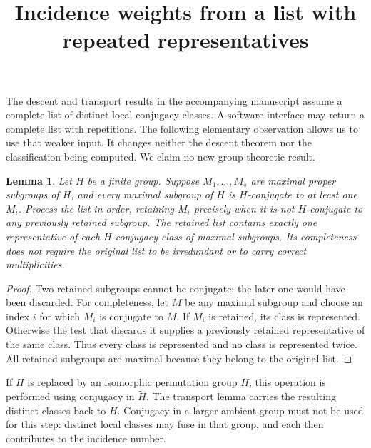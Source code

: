 \documentclass[11pt]{article}
\title{Incidence weights from a list with repeated representatives}
\author{}
\date{}
\newtheorem{lemma}{Lemma}
\begin{document}
\maketitle

The descent and transport results in the accompanying manuscript assume a
complete list of distinct local conjugacy classes. A software interface may
return a complete list with repetitions. The following elementary observation
allows us to use that weaker input. It changes neither the descent theorem
nor the classification being computed. We claim no new group-theoretic result.

\begin{lemma}
Let $H$ be a finite group. Suppose $M_1,\ldots,M_s$ are maximal proper
subgroups of $H$, and every maximal subgroup of $H$ is $H$-conjugate to at
least one $M_i$. Process the list in order, retaining $M_i$ precisely when it
is not $H$-conjugate to any previously retained subgroup. The retained list
contains exactly one representative of each $H$-conjugacy class of maximal
subgroups. Its completeness does not require the original list to be
irredundant or to carry correct multiplicities.
\end{lemma}
\begin{proof}
Two retained subgroups cannot be conjugate: the later one would have been
discarded. For completeness, let $M$ be any maximal subgroup and choose an
index $i$ for which $M_i$ is conjugate to $M$. If $M_i$ is retained, its
class is represented. Otherwise the test that discards it supplies a
previously retained representative of the same class. Thus every class is
represented and no class is represented twice. All retained subgroups are
maximal because they belong to the original list.
\end{proof}

If $H$ is replaced by an isomorphic permutation group $\widetilde H$, this
operation is performed using conjugacy in $\widetilde H$. The transport
lemma carries the resulting distinct classes back to $H$. Conjugacy in a
larger ambient group must not be used for this step: distinct local classes
may fuse in that group, and each then contributes to the incidence number.
\end{document}
